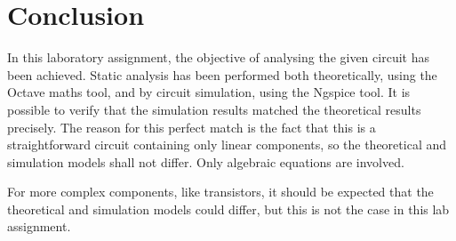 \section{Conclusion}
\label{sec:conclusion}

In this laboratory assignment, the objective of analysing the given circuit has been achieved. Static analysis has been performed both theoretically, using the Octave maths tool, and by circuit simulation, using the Ngspice tool. It is possible to verify that the simulation results matched the theoretical results precisely. The reason for this perfect match is the fact that this is a straightforward circuit containing only linear components, so the theoretical and simulation models shall not differ. Only algebraic equations are involved.
\par
For more complex components, like transistors, it should be expected that the theoretical and simulation models could differ, but this is not the case in this lab assignment.
